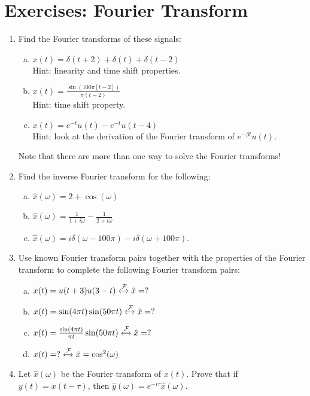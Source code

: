 \newpage
\section{Exercises: Fourier Transform}
\begin{enumerate}
\item Find the Fourier transforms of these signals:
\begin{enumerate}[a)]
\item $x(t)=\delta(t+2)+\delta(t)+\delta(t-2)$ \\Hint: linearity and time shift properties.
\item $x(t)=\frac{\sin(100\pi [t-2])}{\pi (t-2)}$ \\Hint: time shift property.
\item $x(t)=e^{-t}u(t) - e^{-t} u(t-4)$ \\Hint: look at the derivation of the Fourier transform of $e^{-\beta t} u(t)$.
\end{enumerate}
Note that there are more than one way to solve the Fourier transforms!

\item Find the inverse Fourier transform for the following:
\begin{enumerate}[a)]
\item $\hat{x}(\omega)= 2 + \cos(\omega)$
\item $\hat{x}(\omega) = \frac{1}{1+i\omega} - \frac{1}{2+i\omega}$
\item $\hat{x}(\omega) = i \delta(\omega - 100\pi) - i\delta(\omega + 100\pi)$.
\end{enumerate}

\item Use known Fourier transform pairs together with the properties of the Fourier transform to complete the following Fourier transform pairs:
  \begin{enumerate}[a)]
  \item $x(t) = u(t+3)u(3-t) \xleftrightarrow{\mathcal{F}} \hat{x} = ?$
  \item $x(t) = \sin(4\pi t) \sin(50 \pi t)  \xleftrightarrow{\mathcal{F}} \hat{x} = ?$
  \item $x(t) = \frac{\sin(4\pi t)}{\pi t} \sin(50 \pi t)  \xleftrightarrow{\mathcal{F}} \hat{x} = ?$
  \item $x(t) = ?  \xleftrightarrow{\mathcal{F}} \hat{x} = \cos^2(\omega)$    
  \end{enumerate}

\item Let $\hat{x}(\omega)$ be the Fourier transform of $x(t)$. Prove that if $y(t)=x(t-\tau)$, then $\hat{y}(\omega)=e^{-i\tau}\hat{x}(\omega)$. 
  
  
  
  
\end{enumerate}
